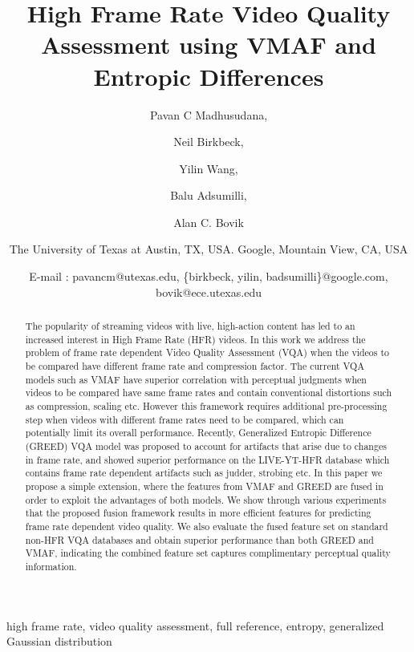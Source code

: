\documentclass[conference]{IEEEtran}
\begin{document}
\title{High Frame Rate Video Quality Assessment using VMAF and Entropic Differences}
\author{Pavan C Madhusudana, \and Neil Birkbeck, \and Yilin Wang, \and Balu Adsumilli, \and Alan C. Bovik \and
\centerline{The University of Texas at Austin, TX, USA. Google, Mountain View, CA, USA} \and \centerline{E-mail : pavancm@utexas.edu, \{birkbeck, yilin, badsumilli\}@google.com, bovik@ece.utexas.edu}}





\maketitle

\begin{abstract}
The popularity of streaming videos with live, high-action content has led to an increased interest in High Frame Rate (HFR) videos. In this work we address the problem of frame rate dependent Video Quality Assessment (VQA) when the videos to be compared have different frame rate and compression factor. The current VQA models such as VMAF have superior correlation with perceptual judgments when videos to be compared have same frame rates and contain conventional distortions such as compression, scaling etc. However this framework requires additional pre-processing step when videos with different frame rates need to be compared, which can potentially limit its overall performance. Recently, Generalized Entropic Difference (GREED) VQA model was proposed to account for artifacts that arise due to changes in frame rate, and showed superior performance on the LIVE-YT-HFR database which contains frame rate dependent artifacts such as judder, strobing etc. In this paper we propose a simple extension, where the features from VMAF and GREED are fused in order to exploit the advantages of both models. We show through various experiments that the proposed fusion framework results in more efficient features for predicting frame rate dependent video quality. We also evaluate the fused feature set on standard non-HFR VQA databases and obtain superior performance than both GREED and VMAF, indicating the combined feature set captures complimentary perceptual quality information. 
\end{abstract}

\begin{IEEEkeywords}
high frame rate, video quality assessment, full reference, entropy, generalized Gaussian distribution
\end{IEEEkeywords}
\end{document}

